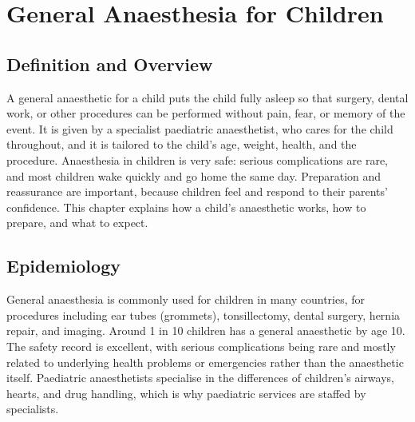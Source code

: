 \chapter{General Anaesthesia for Children}

\section*{Definition and Overview}
A general anaesthetic for a child puts the child fully asleep so that surgery, dental work, or other procedures can be performed without pain, fear, or memory of the event. It is given by a specialist paediatric anaesthetist, who cares for the child throughout, and it is tailored to the child's age, weight, health, and the procedure. Anaesthesia in children is very safe: serious complications are rare, and most children wake quickly and go home the same day. Preparation and reassurance are important, because children feel and respond to their parents' confidence. This chapter explains how a child's anaesthetic works, how to prepare, and what to expect.

\section*{Epidemiology}
General anaesthesia is commonly used for children in many countries, for procedures including ear tubes (grommets), tonsillectomy, dental surgery, hernia repair, and imaging. Around 1 in 10 children has a general anaesthetic by age 10. The safety record is excellent, with serious complications being rare and mostly related to underlying health problems or emergencies rather than the anaesthetic itself. Paediatric anaesthetists specialise in the differences of children's airways, hearts, and drug handling, which is why paediatric services are staffed by specialists.


